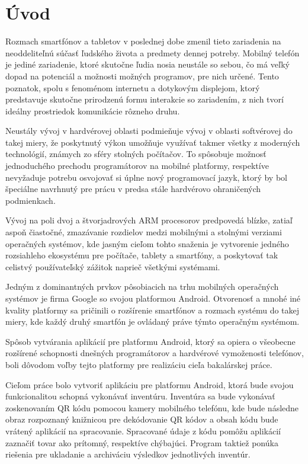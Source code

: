\setcounter{page}{1}
\setcounter{equation}{0}
\setcounter{figure}{0}
\setcounter{table}{0}

\section*{\'Uvod}
	Rozmach smartfónov a tabletov v poslednej dobe zmenil tieto zariadenia na neoddeliteľnú súčasť ľudského života a predmety dennej potreby. Mobilný telefón je jediné zariadenie, ktoré skutočne ľudia nosia neustále so sebou, čo má veľký dopad na potenciál a možnosti možných programov, pre nich určené. Tento poznatok, spolu s fenoménom internetu a dotykovým displejom, ktorý predstavuje skutočne prirodzenú formu interakcie so zariadením, z nich tvorí ideálny prostriedok komunikácie rôzneho druhu.

	Neustály vývoj v hardvérovej oblasti podmieňuje vývoj v oblasti softvérovej do takej miery, že poskytnutý výkon umožňuje využívať takmer všetky z moderných technológií, známych zo sféry stolných počítačov. To spôsobuje možnosť jednoduchého prechodu programátorov na mobilné platformy, respektíve nevyžaduje potrebu osvojovať si úplne nový programovací jazyk, ktorý by bol špeciálne navrhnutý pre prácu v predsa stále hardvérovo ohraničených podmienkach.

	Vývoj na poli dvoj a štvorjadrových ARM procesorov predpovedá blízke, zatiaľ aspoň čiastočné, zmazávanie rozdielov medzi mobilnými a stolnými verziami operačných systémov, kde jasným cieľom tohto snaženia je vytvorenie jedného rozsiahleho ekosystému pre počítače, tablety a smartfóny, a poskytovať tak celistvý používateľský zážitok naprieč všetkými systémami.

	Jedným z dominantných prvkov pôsobiacich na trhu mobilných operačných systémov je firma Google so svojou platformou Android. Otvorenosť a mnohé iné kvality platformy sa pričinili o rozšírenie smartfónov a rozmach systému do takej miery, kde každý druhý smartfón je ovládaný práve týmto operačným systémom.

	Spôsob vytvárania aplikácií pre platformu Android, ktorý sa opiera o všeobecne rozšírené schopnosti dnešných programátorov a hardvérové vymoženosti telefónov, boli dôvodom voľby tejto platformy pre realizáciu cieľa bakalárskej práce.

	Cieľom práce bolo vytvoriť aplikáciu pre platformu Android, ktorá bude svojou funkcionalitou schopná vykonávať inventúru. Inventúra sa bude vykonávať zoskenovaním  QR kódu pomocou kamery mobilného telefónu, kde bude následne obraz rozpoznaný knižnicou pre dekódovanie QR kódov a obsah kódu bude vrátený aplikácií na spracovanie. Spracované údaje z kódu pomôžu aplikácií zaznačiť tovar ako prítomný, respektíve chýbajúci. Program taktiež ponúka riešenia pre ukladanie a archiváciu výsledkov jednotlivých inventúr.


